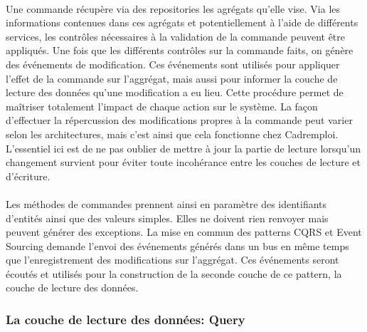 \paragraph{}
Une commande récupère via des repositories les agrégats qu'elle vise.
Via les informations contenues dans ces agrégats et potentiellement à l'aide de différents services, les contrôles nécessaires à la validation de la commande peuvent être appliqués.
Une fois que les différents contrôles sur la commande faits, on génère des événements de modification.
Ces événements sont utilisés pour appliquer l'effet de la commande sur l'aggrégat, mais aussi pour informer la couche de lecture des données qu'une modification a eu lieu.
Cette procédure permet de maîtriser totalement l'impact de chaque action sur le système.
La façon d'effectuer la répercussion des modifications propres à la commande peut varier selon les architectures, mais c'est ainsi que cela fonctionne chez Cadremploi.
L'essentiel ici est de ne pas oublier de mettre à jour la partie de lecture lorsqu'un changement survient pour éviter toute incohérance entre les couches de lecture et d'écriture.
\paragraph{}
Les méthodes de commandes prennent ainsi en paramètre des identifiants d'entités ainsi que des valeurs simples.
Elles ne doivent rien renvoyer mais peuvent générer des exceptions.
La mise en commun des patterns CQRS et Event Sourcing demande l'envoi des événements générés dans un bus en même temps que l'enregistrement des modifications sur l'aggrégat.
Ces événements seront écoutés et utilisés pour la construction de la seconde couche de ce pattern, la couche de lecture des données.

\subsubsection{La couche de lecture des données: Query}
\label{subs:La couche de lecture des données: Query}
